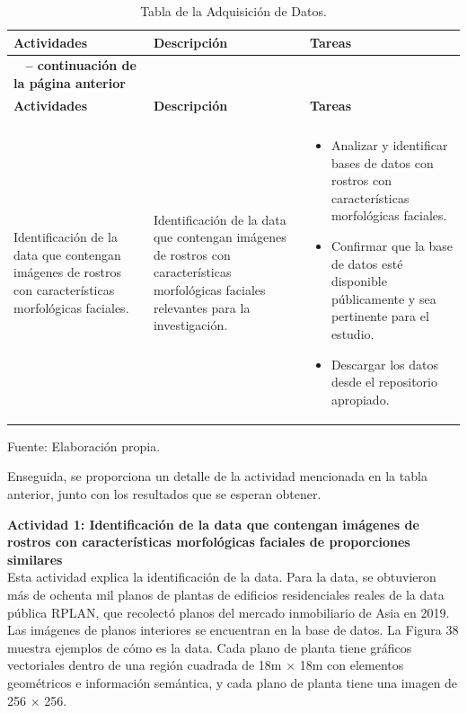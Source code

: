 \begin{longtable}{>{\raggedright\arraybackslash}p{4cm} >{\raggedright\arraybackslash}p{4cm} >{\raggedright\arraybackslash}p{5cm}}
    \caption{Tabla de la Adquisición de Datos.}
    \label{tabla:actividades}\\
    \hline
    \textbf{Actividades} & \textbf{Descripción} & \textbf{Tareas}\\
    \hline
    \endfirsthead

    \multicolumn{3}{c}%
    {{\bfseries \tablename\ \thetable{} -- continuación de la página anterior}} \\
    \hline
    \textbf{Actividades} & \textbf{Descripción} & \textbf{Tareas}\\
    \hline
    \endhead

    \hline
    \multicolumn{3}{r}{{Continúa en la siguiente página}} \\
    \endfoot

    \hline
    \endlastfoot

    Identificación de la data que contengan imágenes de rostros con características morfológicas faciales. & Identificación de la data que contengan imágenes de rostros con características morfológicas faciales relevantes para la investigación. & 
    \begin{itemize}
        \item Analizar y identificar bases de datos con rostros con características morfológicas faciales.
        \item Confirmar que la base de datos esté disponible públicamente y sea pertinente para el estudio.
        \item Descargar los datos desde el repositorio apropiado.
    \end{itemize} \\
\end{longtable}


\begin{flushleft}
    \small Fuente: Elaboración propia.
\end{flushleft}

Enseguida, se proporciona un detalle de la actividad mencionada en la tabla anterior, junto con los resultados que se esperan obtener.

\textbf{Actividad 1: Identificación de la data que contengan imágenes de rostros con características morfológicas faciales de proporciones similares}
\\
Esta actividad explica la identificación de la data. Para la data, se obtuvieron más de ochenta mil planos de plantas de edificios residenciales reales de la data pública RPLAN, que recolectó planos del mercado inmobiliario de Asia en 2019. Las imágenes de planos interiores se encuentran en la base de datos. La Figura 38 muestra ejemplos de cómo es la data. Cada plano de planta tiene gráficos vectoriales dentro de una región cuadrada de 18m × 18m con elementos geométricos e información semántica, y cada plano de planta tiene una imagen de 256 × 256.

